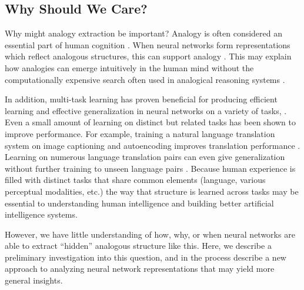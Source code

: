 \documentclass[10pt,letterpaper]{article}
\begin{document}
\subsection{Why Should We Care?}
Why might analogy extraction be important? Analogy is often considered an essential part of human cognition \cite[e.g.]{Gentner2003}. When neural networks form representations which reflect analogous structures, this can support analogy \citep{Pennington2014,Kollias2013}. This may explain how analogies can emerge intuitively in the human mind without the computationally expensive search often used in analogical reasoning systems \cite[e.g.]{Falkenhainer1989}. \par
In addition, multi-task learning has proven beneficial for producing efficient learning and effective generalization in neural networks on a variety of tasks, \cite[e.g.]{Dong2015,Rusu2015}. Even a small amount of learning on distinct but related tasks has been shown to improve performance. For example, training a natural language translation system on image captioning and autoencoding improves translation performance \citep{Luong2016}. Learning on numerous language translation pairs can even give generalization without further training to unseen language pairs \citep{Johnson2016a}. Because human experience is filled with distinct tasks that share common elements (language, various perceptual modalities, etc.) the way that structure is learned across tasks may be essential to understanding human intelligence and building better artificial intelligence systems.\par
However, we have little understanding of how, why, or when neural networks are able to extract ``hidden'' analogous structure like this. Here, we describe a preliminary investigation into this question, and in the process describe a new approach to analyzing neural network representations that may yield more general insights. 
\end{document}

